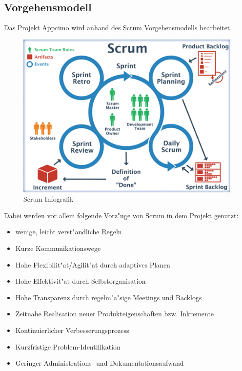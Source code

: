 \documentclass[a4paper, 11pt]{scrreprt}
\begin{document}
\subsection{Vorgehensmodell}
Das Projekt Appcimo wird anhand des Scrum Vorgehensmodells bearbeitet.

\begin{figure} [H]
\begin{center}


\includegraphics[width=12cm]{Scrum.png}
\caption{Scrum Infografik}
\label{Scrum_logo}

\end{center}
\end{figure}

Dabei werden vor allem folgende Vorz"uge von Scrum in dem Projekt genutzt:

\begin{itemize}
\item{wenige, leicht verst"andliche Regeln}
\item{Kurze Kommunikationswege}
\item{Hohe Flexibilit"at/Agilit"at durch adaptives Planen}
\item{Hohe Effektivit"at durch Selbstorganisation}
\item{Hohe Transparenz durch regelm"a"sige Meetings und Backlogs}
\item{Zeitnahe Realisation neuer Produkteigenschaften bzw. Inkremente}
\item{Kontinuierlicher Verbesserungsprozess}
\item{Kurzfristige Problem-Identifikation}
\item{Geringer Administrations- und Dokumentationsaufwand}
\end{itemize}
\end{document}
